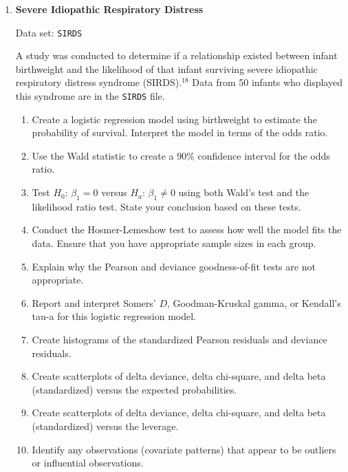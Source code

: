 \documentclass[
]{book}
\begin{document}
\begin{enumerate}
  \begin{enumerate}
    \item Create a logistic regression model using years of education to estimate the probability of conviction. Interpret the model in terms of the odds ratio.
    \item Interpret the results of Wald’s test and the LRT.
    \item Conduct Fisher’s exact test and a chi-square test of independence (discussed in Chapter 6) using the \texttt{Convict} data. How do these tests compare to the logistic regression model?
    \item Report and interpret Somers’ $D$, Goodman-Kruskal gamma, or Kendall’s tau-a for this logistic regression model.
  \end{enumerate}

  \item \textbf{Severe Idiopathic Respiratory Distress}

Data set: \texttt{SIRDS}

A study was conducted to determine if a relationship existed between infant birthweight and the likelihood of that infant surviving severe idiopathic respiratory distress syndrome (SIRDS).$^{18}$ Data from 50 infants who displayed this syndrome are in the \texttt{SIRDS} file.

  \begin{enumerate}
    \item Create a logistic regression model using birthweight to estimate the probability of survival. Interpret the model in terms of the odds ratio.
    \item Use the Wald statistic to create a 90\% confidence interval for the odds ratio.
    \item Test $H_0$: $\beta_1 = 0$ versus $H_a$: $\beta_1 \ne 0$ using both Wald’s test and the likelihood ratio test. State your conclusion based on these tests.
    \item Conduct the Hosmer-Lemeshow test to assess how well the model fits the data. Ensure that you have appropriate sample sizes in each group.
    \item Explain why the Pearson and deviance goodness-of-fit tests are not appropriate.
    \item Report and interpret Somers’ $D$, Goodman-Kruskal gamma, or Kendall’s tau-a for this logistic regression model.
    \item Create histograms of the standardized Pearson residuals and deviance residuals.
    \item Create scatterplots of delta deviance, delta chi-square, and delta beta (standardized) versus the expected probabilities.
    \item Create scatterplots of delta deviance, delta chi-square, and delta beta (standardized) versus the leverage.
    \item Identify any observations (covariate patterns) that appear to be outliers or influential observations.
  \end{enumerate}


\end{enumerate}
\end{document}
